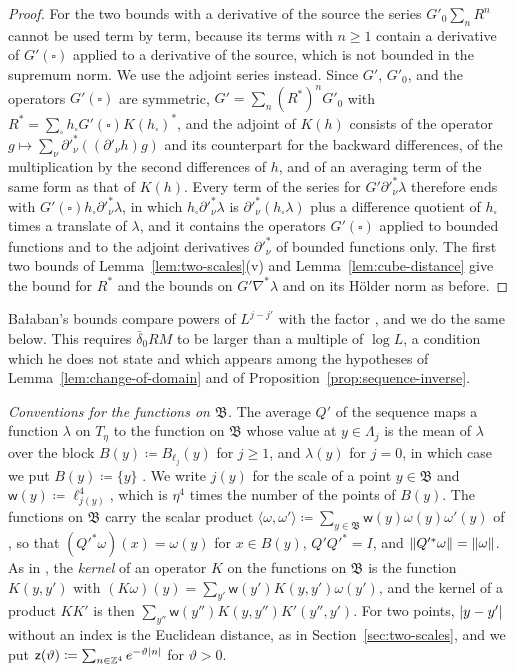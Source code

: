 \documentclass[11pt]{preprint}
\DeclarePairedDelimiter{\abs}{\lvert}{\rvert}
\DeclarePairedDelimiter{\norm}{\lVert}{\rVert}
\numberwithin{equation}{section}
\theoremstyle{definition}
\theoremstyle{remark}
\theoremstyle{plain}
\begin{document}
\begin{proof}
For the two bounds with a derivative of the source the series $G'_0\sum_nR^n$ cannot be used term by term, because its terms with $n \geq 1$ contain a derivative of $G'(\square)$ applied to a derivative of the source, which is not bounded in the supremum norm. We use the adjoint series instead. Since $G'$, $G'_0$, and the operators $G'(\square)$ are symmetric, $G' = \sum_n(R^*)^nG'_0$ with $R^* = \sum_\square h_\square G'(\square)K(h_\square)^*$, and the adjoint of $K(h)$ consists of the operator $g \mapsto \sum_\nu\partial'^*_\nu((\partial'_\nu h)g)$ and its counterpart for the backward differences, of the multiplication by the second differences of $h$, and of an averaging term of the same form as that of $K(h)$. Every term of the series for $G'\partial'^*_\nu\lambda$ therefore ends with $G'(\square)h_\square\partial'^*_\nu\lambda$, in which $h_\square\partial'^*_\nu\lambda$ is $\partial'^*_\nu(h_\square\lambda)$ plus a difference quotient of $h_\square$ times a translate of $\lambda$, and it contains the operators $G'(\square)$ applied to bounded functions and to the adjoint derivatives $\partial'^*_\nu$ of bounded functions only. The first two bounds of Lemma~\ref{lem:two-scales}(v) and Lemma~\ref{lem:cube-distance} give the bound \cite[(2.51)]{BalabanPRT2} for $R^*$ and the bounds on $G'\nabla^*\lambda$ and on its H\"older norm as before.
\end{proof}

Ba{\l}aban's bounds \cite[(2.68), (2.83)]{BalabanPRT2} compare powers of $L^{j - j'}$ with the factor \cite[(2.60)]{BalabanPRT2}, and we do the same below. This requires $\bar\delta_0RM$ to be larger than a multiple of $\log L$, a condition which he does not state and which appears among the hypotheses of Lemma~\ref{lem:change-of-domain} and of Proposition~\ref{prop:sequence-inverse}.

\emph{Conventions for the functions on $\mathfrak B$.} The average $Q'$ of the sequence maps a function $\lambda$ on $T_\eta$ to the function on $\mathfrak B$ whose value at $y \in \Lambda_j$ is the mean of $\lambda$ over the block $B(y) \coloneqq B_{\ell_j}(y)$ for $j \geq 1$, and $\lambda(y)$ for $j = 0$, in which case we put $B(y) \coloneqq \{ y \}$ \cite[p.~225]{BalabanPRT2}. We write $j(y)$ for the scale of a point $y \in \mathfrak B$ and $\mathsf w(y) \coloneqq \ell_{j(y)}^4$, which is $\eta^4$ times the number of the points of $B(y)$. The functions on $\mathfrak B$ carry the scalar product $\langle\omega, \omega'\rangle \coloneqq \sum_{y \in \mathfrak B}\mathsf w(y)\omega(y)\omega'(y)$ of \cite[(2.69)]{BalabanPRT2}, so that $(Q'^*\omega)(x) = \omega(y)$ for $x \in B(y)$, $Q'Q'^* = I$, and $\norm{Q'^*\omega} = \norm\omega$. As in \cite[(2.68), (2.81), (2.87)]{BalabanPRT2}, the \emph{kernel} of an operator $K$ on the functions on $\mathfrak B$ is the function $K(y, y')$ with $(K\omega)(y) = \sum_{y'}\mathsf w(y')K(y, y')\omega(y')$, and the kernel of a product $KK'$ is then $\sum_{y''}\mathsf w(y'')K(y, y'')K'(y'', y')$. For two points, $\abs{y - y'}$ without an index is the Euclidean distance, as in Section~\ref{sec:two-scales}, and we put $\mathsf z(\vartheta) \coloneqq \sum_{n \in \mathbb Z^4}e^{-\vartheta\abs n}$ for $\vartheta > 0$.
\end{document}
